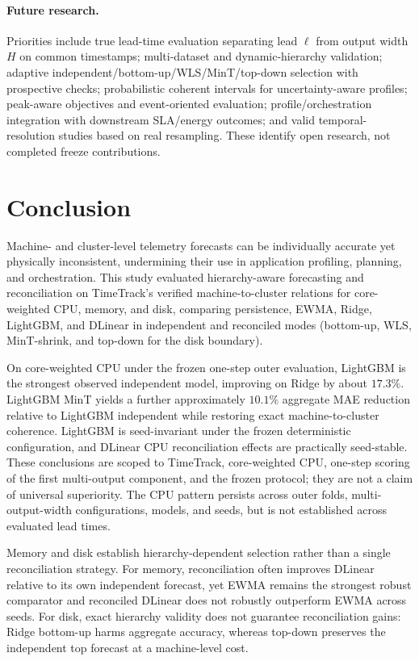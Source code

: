 \documentclass[a4paper,fleqn]{cas-dc}
\begin{document}
\paragraph{Future research.}
Priorities include true lead-time evaluation separating lead $\ell$ from output
width $H$ on common timestamps; multi-dataset and dynamic-hierarchy validation;
adaptive independent/bottom-up/{WLS}/MinT/top-down selection with prospective
checks; probabilistic coherent intervals for uncertainty-aware profiles;
peak-aware objectives and event-oriented evaluation; profile/orchestration
integration with downstream {SLA}/energy outcomes; and valid
temporal-resolution studies based on real resampling.
These identify open research, not completed freeze contributions.

\section{Conclusion}
\label{sec:conclusion}

Machine- and cluster-level telemetry forecasts can be individually accurate yet
physically inconsistent, undermining their use in application profiling,
planning, and orchestration.
This study evaluated hierarchy-aware forecasting and reconciliation on
TimeTrack's verified machine-to-cluster relations for core-weighted {CPU},
memory, and disk, comparing persistence, {EWMA}, Ridge, LightGBM, and DLinear
in independent and reconciled modes (bottom-up, {WLS}, MinT-shrink, and
top-down for the disk boundary).

On core-weighted {CPU} under the frozen one-step outer evaluation, LightGBM is
the strongest observed independent model, improving on Ridge by about $17.3\%$.
LightGBM MinT yields a further approximately $10.1\%$ aggregate {MAE} reduction
relative to LightGBM independent while restoring exact machine-to-cluster
coherence.
LightGBM is seed-invariant under the frozen deterministic configuration, and
DLinear {CPU} reconciliation effects are practically seed-stable.
These conclusions are scoped to TimeTrack, core-weighted {CPU}, one-step
scoring of the first multi-output component, and the frozen protocol; they are
not a claim of universal superiority.
The {CPU} pattern persists across outer folds, multi-output-width
configurations, models, and seeds, but is not established across evaluated lead
times.

Memory and disk establish hierarchy-dependent selection rather than a single
reconciliation strategy.
For memory, reconciliation often improves DLinear relative to its own
independent forecast, yet {EWMA} remains the strongest robust comparator and
reconciled DLinear does not robustly outperform {EWMA} across seeds.
For disk, exact hierarchy validity does not guarantee reconciliation gains:
Ridge bottom-up harms aggregate accuracy, whereas top-down preserves the
independent top forecast at a machine-level cost.
\end{document}
